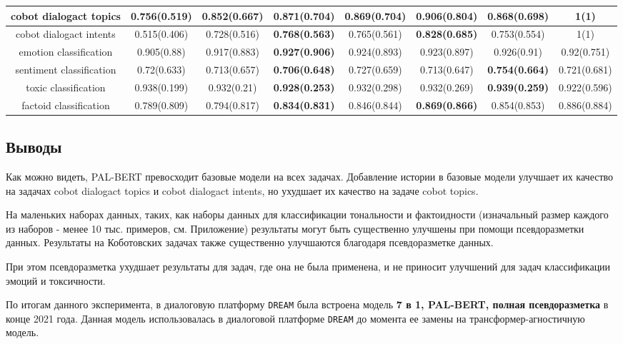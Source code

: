 \begin{table}[htbp]
{\begin{tabular}{|c||c|c|c|c|c|c|c|}
\hline
cobot dialogact topics & 0.756(0.519) & 0.852(0.667) & \textbf{0.871(0.704)} & 0.869(0.704) & \textbf{0.906(0.804)} & 0.868(0.698) & 1(1) \\
\hline
cobot dialogact intents & 0.515(0.406) & 0.728(0.516) & \textbf{0.768(0.563)} & 0.765(0.561) & \textbf{0.828(0.685)} & 0.753(0.554) & 1(1) \\
\hline
emotion classification & 0.905(0.88) & 0.917(0.883) & \textbf{0.927(0.906)} & 0.924(0.893) & 0.923(0.897) & 0.926(0.91) & 0.92(0.751) \\
\hline
sentiment classification & 0.72(0.633) & 0.713(0.657) & \textbf{0.706(0.648)} & 0.727(0.659) & 0.713(0.647) & \textbf{0.754(0.664)} & 0.721(0.681) \\
\hline
toxic classification & 0.938(0.199) & 0.932(0.21) & \textbf{0.928(0.253)} & 0.932(0.298) & 0.932(0.269) & \textbf{0.939(0.259)} & 0.922(0.596) \\
\hline
factoid classification & 0.789(0.809) & 0.794(0.817) & \textbf{0.834(0.831)} & 0.846(0.844) & \textbf{0.869(0.866)} & 0.854(0.853) & 0.886(0.884) \\
\hline
\end{tabular}
}
\end{table}

\subsection{Выводы}
Как можно видеть, PAL-BERT превосходит базовые модели на всех задачах. Добавление истории в базовые модели улучшает их качество на задачах cobot dialogact topics и cobot dialogact intents, но ухудшает их качество на задаче cobot topics.

На маленьких наборах данных, таких, как наборы данных для классификации тональности и фактоидности (изначальный размер каждого из наборов - менее 10 тыс. примеров, см. Приложение) результаты могут быть существенно улучшены при помощи псевдоразметки данных. Результаты на Коботовских задачах также существенно улучшаются благодаря псевдоразметке данных.

При этом псевдоразметка ухудшает результаты для задач, где она не была применена, и не приносит улучшений для задач классификации эмоций и токсичности.

По итогам данного эксперимента, в диалоговую платформу \texttt{DREAM} была встроена модель \textbf{7 в 1, PAL-BERT, полная псевдоразметка} в конце 2021 года. Данная модель использовалась в диалоговой платформе \texttt{DREAM} до момента ее замены на трансформер-агностичную модель.

